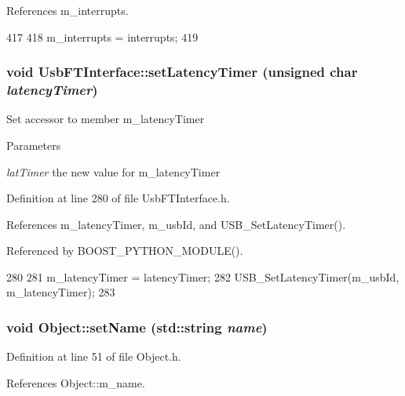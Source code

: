 References m\_\-interrupts.


\begin{DoxyCode}
417                                        {
418     m_interrupts = interrupts;
419   }
\end{DoxyCode}
\hypertarget{classUsbFTInterface_abe0147f74ac414d0bd2cb4a7a81024b9}{
\subsubsection[{setLatencyTimer}]{\setlength{\rightskip}{0pt plus 5cm}void UsbFTInterface::setLatencyTimer (unsigned char {\em latencyTimer})}}
\label{classUsbFTInterface_abe0147f74ac414d0bd2cb4a7a81024b9}
Set accessor to member m\_\-latencyTimer 
\begin{DoxyParams}{Parameters}
\item[{\em latTimer}]the new value for m\_\-latencyTimer \end{DoxyParams}


Definition at line 280 of file UsbFTInterface.h.

References m\_\-latencyTimer, m\_\-usbId, and USB\_\-SetLatencyTimer().

Referenced by BOOST\_\-PYTHON\_\-MODULE().


\begin{DoxyCode}
280                                                     {
281     m_latencyTimer = latencyTimer;
282     USB_SetLatencyTimer(m_usbId, m_latencyTimer);
283   }
\end{DoxyCode}
\hypertarget{classObject_ae30fea75683c2d149b6b6d17c09ecd0c}{
\subsubsection[{setName}]{\setlength{\rightskip}{0pt plus 5cm}void Object::setName (std::string {\em name})}}
\label{classObject_ae30fea75683c2d149b6b6d17c09ecd0c}


Definition at line 51 of file Object.h.

References Object::m\_\-name.

